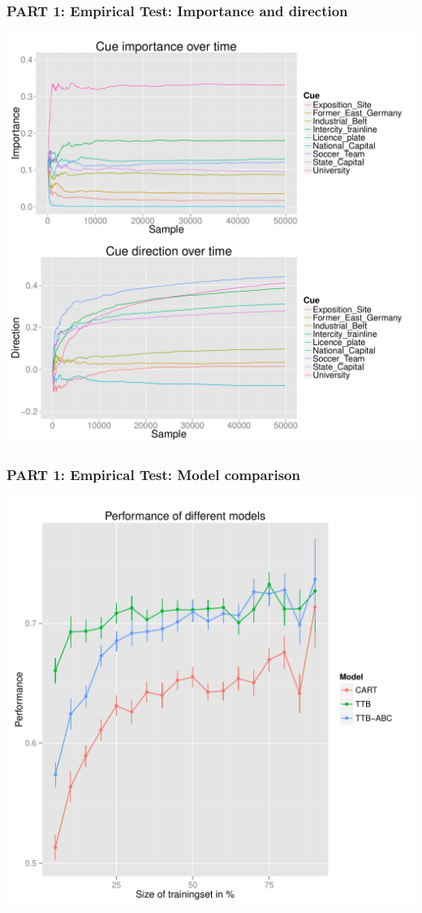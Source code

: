 \documentclass{beamer}
\begin{document}
\begin{frame}
 \frametitle{PART 1: Empirical Test: Importance and direction}
\begin{center}
\includegraphics[scale=0.22]{ttbcity.pdf}
\end{center}
\end{frame}

\begin{frame}
 \frametitle{PART 1: Empirical Test: Model comparison}
\vspace{-0.2cm}
\begin{center}
\includegraphics[scale=0.37]{perfcitysize.pdf}
\end{center}
\end{frame}
\end{document}
